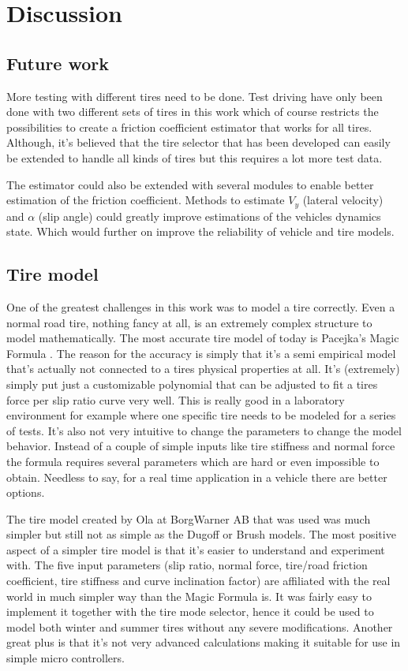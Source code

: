 \chapter{Discussion}

\section{Future work}
More testing with different tires need to be done. Test driving have only been done with two different sets of tires in this work which of course restricts the possibilities to create a friction coefficient estimator that works for all tires. Although, it's believed that the tire selector that has been developed can easily be extended to handle all kinds of tires but this requires a lot more test data.

The estimator could also be extended with several modules to enable better estimation of the friction coefficient. Methods to estimate $ V_{y} $ (lateral velocity) and $ \alpha $ (slip angle) could greatly improve estimations of the vehicles dynamics state. Which would further on improve the reliability of vehicle and tire models.

\section{Tire model}
One of the greatest challenges in this work was to model a tire correctly. Even a normal road tire, nothing fancy at all, is an extremely complex structure to model mathematically. The most accurate tire model of today is Pacejka's Magic Formula \cite{pacejka}. The reason for the accuracy is simply that it's a semi empirical model that's actually not connected to a tires physical properties at all. It's (extremely) simply put just a customizable polynomial that can be adjusted to fit a tires force per slip ratio curve very well. This is really good in a laboratory environment for example where one specific tire needs to be modeled for a series of tests. It's also not very intuitive to change the parameters to change the model behavior. Instead of a couple of simple inputs like tire stiffness and normal force the formula requires several parameters which are hard or even impossible to obtain. Needless to say, for a real time application in a vehicle there are better options.

The tire model created by Ola at BorgWarner AB that was used was much simpler but still not as simple as the Dugoff or Brush models. The most positive aspect of a simpler tire model is that it's easier to understand and experiment with. The five input parameters (slip ratio, normal force, tire/road friction coefficient, tire stiffness and curve inclination factor) are affiliated with the real world in much simpler way than the Magic Formula is. It was fairly easy to implement it together with the tire mode selector, hence it could be used to model both winter and summer tires without any severe modifications. Another great plus is that it's not very advanced calculations making it suitable for use in simple micro controllers. 

